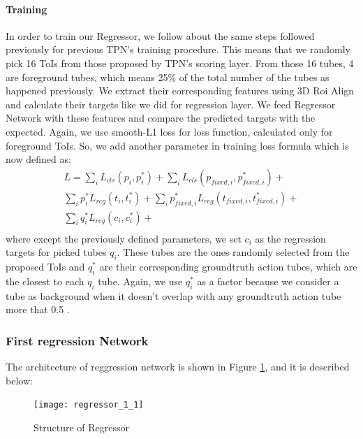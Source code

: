 \paragraph{ Training}
In order to train our Regressor, we follow about the same steps followed previously for previous TPN's training procedure. This means that
we randomly pick 16 ToIs from those proposed by TPN's scoring layer. From those 16 tubes, 4 are foreground tubes, which means 25\% of the total
number of the tubes as happened previously. We extract their corresponding features using 3D Roi Align and calculate their targets like
we did for regression layer. We feed Regressor Network with these features and compare the predicted targets with the expected.
Again, we use smooth-L1 loss for loss function, calculated only for foreground ToIs. So, we add another parameter in
training loss formula which is now defined as:
\begin{equation} 
\begin{split}
 L  =  \sum_iL_{cls}(p_i, p_i^*) + \sum_iL_{cls}(p_{fixed,i}, p_{fixed,i}^*) + \\
 \sum_ip_i^*L_{reg}(t_i,t_i^*) + \sum_ip_{fixed,i}^*L_{reg}(t_{fixed,i},t_{fixed,i}^*) + \\
  \sum_iq_i^*L_{reg}(c_{i}, c_{i}^*) + \\
\end{split}
\end{equation}
where  except the previously defined parameters, we set  $c_{i} $ as the regression targets for picked tubes $q_i$.
These tubes are the ones randomly selected from the proposed ToIs and $q_i^*$ are their corresponding groundtruth action tubes, which are the closest to each $q_i$ tube.
Again, we use $q_i^*$ as a factor because we consider a tube as background when it doesn't overlap with any groundtruth action tube more that 0.5 .

\subsubsection{First regression Network} 

The architecture of reggression network is shown in Figure \ref{fig:regressor_3d}, and it is described below:
\begin{figure}[h]
  \centering
  \texttt{[image: regressor\_1\_1]}
  \caption{Structure of Regressor}
  \label{fig:regressor_3d}
\end{figure}

